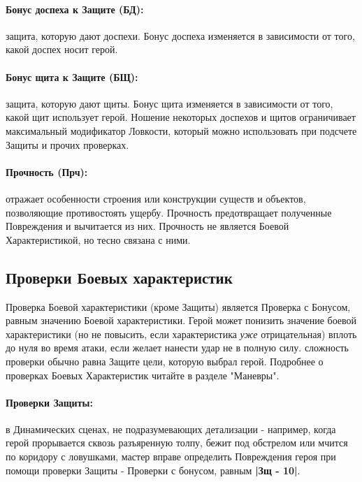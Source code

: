 \paragraph{Бонус доспеха к Защите (БД):} защита, которую дают доспехи. Бонус доспеха изменяется в зависимости от того, какой доспех носит герой.
\paragraph{Бонус щита к Защите (БЩ):} защита, которую дают щиты. Бонус щита изменяется в зависимости от того, какой щит использует герой.
\newline Ношение некоторых доспехов и щитов ограничивает максимальный модификатор Ловкости, который можно использовать при подсчете Защиты и прочих проверках.
\paragraph{Прочность (Прч):} отражает особенности строения или конструкции существ и объектов, позволяющие противостоять ущербу. Прочность предотвращает полученные Повреждения и вычитается из них.
\newline Прочность не является Боевой Характеристикой, но тесно связана с ними.

\subsection{Проверки Боевых характеристик}
Проверка Боевой характеристики (кроме Защиты) является Проверка с Бонусом, равным значению Боевой характеристики.
\newline Герой может понизить значение боевой характеристики (но не повысить, если характеристика \textit{уже} отрицательная) вплоть до нуля во время атаки, если желает нанести удар не в полную силу.
\newline сложность проверки обычно равна Защите цели, которую выбрал герой.
\newline Подробнее о проверках Боевых Характеристик читайте в разделе "Маневры".

\paragraph{Проверки Защиты:} в Динамических сценах, не подразумевающих детализации - например, когда герой прорывается сквозь разъяренную толпу, бежит под обстрелом или мчится по коридору с ловушками, мастер вправе определить Повреждения героя при помощи проверки Защиты - Проверки с бонусом, равным \textbf{|Зщ - 10|}.

